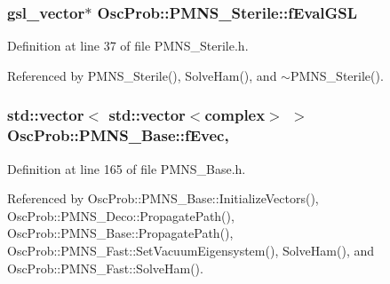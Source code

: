 \subsubsection[{\texorpdfstring{f\+Eval\+G\+SL}{fEvalGSL}}]{\setlength{\rightskip}{0pt plus 5cm}gsl\+\_\+vector$\ast$ Osc\+Prob\+::\+P\+M\+N\+S\+\_\+\+Sterile\+::f\+Eval\+G\+SL\hspace{0.3cm}{\ttfamily [protected]}}\hypertarget{classOscProb_1_1PMNS__Sterile_abdcb0a144aadef0239dfb36ed4ed0297}{}\label{classOscProb_1_1PMNS__Sterile_abdcb0a144aadef0239dfb36ed4ed0297}


Definition at line 37 of file P\+M\+N\+S\+\_\+\+Sterile.\+h.



Referenced by P\+M\+N\+S\+\_\+\+Sterile(), Solve\+Ham(), and $\sim$\+P\+M\+N\+S\+\_\+\+Sterile().

\subsubsection[{\texorpdfstring{f\+Evec}{fEvec}}]{\setlength{\rightskip}{0pt plus 5cm}std\+::vector$<$ std\+::vector$<${\bf complex}$>$ $>$ Osc\+Prob\+::\+P\+M\+N\+S\+\_\+\+Base\+::f\+Evec\hspace{0.3cm}{\ttfamily [protected]}, {\ttfamily [inherited]}}\hypertarget{classOscProb_1_1PMNS__Base_a093e7bd31d4ef52ed52df414e12c1d17}{}\label{classOscProb_1_1PMNS__Base_a093e7bd31d4ef52ed52df414e12c1d17}


Definition at line 165 of file P\+M\+N\+S\+\_\+\+Base.\+h.



Referenced by Osc\+Prob\+::\+P\+M\+N\+S\+\_\+\+Base\+::\+Initialize\+Vectors(), Osc\+Prob\+::\+P\+M\+N\+S\+\_\+\+Deco\+::\+Propagate\+Path(), Osc\+Prob\+::\+P\+M\+N\+S\+\_\+\+Base\+::\+Propagate\+Path(), Osc\+Prob\+::\+P\+M\+N\+S\+\_\+\+Fast\+::\+Set\+Vacuum\+Eigensystem(), Solve\+Ham(), and Osc\+Prob\+::\+P\+M\+N\+S\+\_\+\+Fast\+::\+Solve\+Ham().


